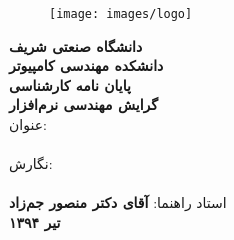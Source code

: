 \thispagestyle{empty}
\begin{center}
\vspace{-2cm}
\begin{figure}
\centerline{\texttt{[image: images/logo]}}
\end{figure}
\makeatletter
{\bf دانشگاه صنعتی شریف  }\\ 
{\bf دانشکده مهندسی کامپیوتر }\vspace{0.3cm}\\
{\bf پایان نامه کارشناسی  }\\ 
{ \bf گرایش مهندسی نرم‌افزار }\\
\vspace{0.4cm}
 عنوان:\\
\vspace{0.3cm}
{\Huge\bf  \@title}\vspace{1cm}\\

نگارش:\vspace{0.2cm}\\
{\Large \bf \@author}\\
\vspace{0.5cm}
 استاد راهنما: {\Large \bf  آقای دکتر منصور جم‌زاد }\\
\vspace{0.3cm}
{\large \bf  تیر ۱۳۹۴   }\\
\end{center}
\makeatother
\clearpage